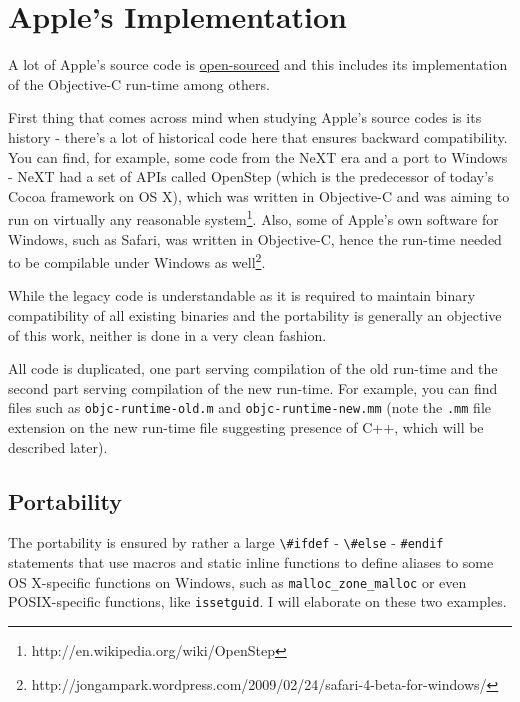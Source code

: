 \chapter{Apple's Implementation}

A lot of Apple's source code is \href{''http://www.opensource.apple.com''}{open-sourced} and this includes its implementation of the Objective-C run-time among others.

First thing that comes across mind when studying Apple's source codes is its history - there's a lot of historical code here that ensures backward compatibility. You can find, for example, some code from the NeXT era and a port to Windows - NeXT had a set of APIs called OpenStep (which is the predecessor of today's Cocoa framework on OS X), which was written in Objective-C and was aiming to run on virtually any reasonable system\footnote{http://en.wikipedia.org/wiki/OpenStep}. Also, some of Apple's own software for Windows, such as Safari, was written in Objective-C, hence the run-time needed to be compilable under Windows as well\footnote{http://jongampark.wordpress.com/2009/02/24/safari-4-beta-for-windows/}.

While the legacy code is understandable as it is required to maintain binary compatibility of all existing binaries and the portability is generally an objective of this work, neither is done in a very clean fashion.

All code is duplicated, one part serving compilation of the old run-time and the second part serving compilation of the new run-time. For example, you can find files such as \verb=objc-runtime-old.m= and \verb=objc-runtime-new.mm= (note the \verb=.mm= file extension on the new run-time file suggesting presence of C++, which will be described later).

\section{Portability}
The portability is ensured by rather a large \verb=\#ifdef= - \verb=\#else= - \verb=#endif= statements that use macros and static inline functions to define aliases to some OS X-specific functions on Windows, such as \verb=malloc_zone_malloc= or even POSIX-specific functions, like \verb=issetguid=. I will elaborate on these two examples.

